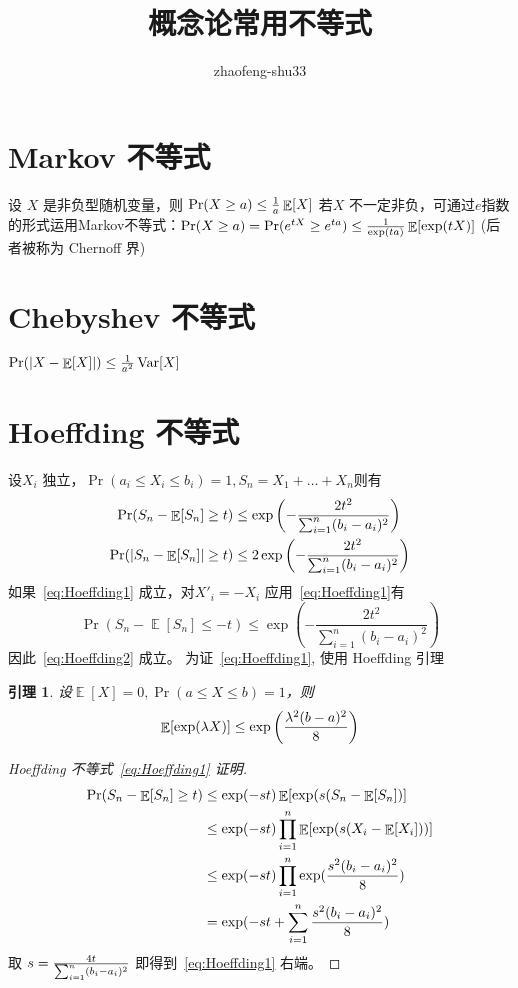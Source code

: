\documentclass{article}
\DeclareMathOperator\E{\mathbb{E}}
\DeclareMathOperator\Var{\mathrm{Var}}
\newtheorem{lemma}{引理}
\theoremstyle{definition}
\DeclarePairedDelimiter\abs{\lvert}{\rvert}
\begin{document}
\title{概念论常用不等式}
\author{zhaofeng-shu33}
\maketitle
\section{Markov 不等式}
设 $X$ 是非负型随机变量，则 $\Pr(X\geq a) \leq {1 \over a} \E[X]$
若$X$ 不一定非负，可通过$e$指数的形式运用Markov不等式：$\Pr(X\geq a) = \Pr(e^{tX} \geq e^{ta}) \leq { 1 \over \exp(ta)} \E[\exp(tX)]$
(后者被称为 Chernoff 界)

\section{Chebyshev 不等式}
$\Pr(\abs{X-\E[X]}) \leq {1 \over a^2} \Var[X]$
\section{Hoeffding 不等式}
设$X_i$ 独立，$\Pr(a_i \leq X_i \leq b_i) = 1, S_n = X_1 + \dots + X_n $则有
\begin{align}
\label{eq:Hoeffding1}\Pr( S_n - \E[S_n] \geq t) & \leq \exp \left( - \frac{2t^2}{\sum_{i=1}^n (b_i - a_i)^2} \right) \\
\label{eq:Hoeffding2}\Pr( \abs{S_n - \E[S_n] } \geq t) & \leq 2\exp \left( - \frac{2t^2}{\sum_{i=1}^n (b_i - a_i)^2} \right)
\end{align}
如果~\eqref{eq:Hoeffding1} 成立，对$X'_i= -X_i$ 应用~\eqref{eq:Hoeffding1}有
$$\Pr( S_n - \E[S_n]  \leq -t )  \leq \exp \left( - \frac{2t^2}{\sum_{i=1}^n (b_i - a_i)^2} \right)$$
因此~\eqref{eq:Hoeffding2} 成立。
为证~\eqref{eq:Hoeffding1}, 使用 Hoeffding 引理
\begin{lemma}
设$\E[X]=0, \Pr( a \leq X \leq b) = 1 $，则
\begin{equation}
\E[ \exp(\lambda X) ] \leq \exp\left({\lambda^2 (b-a)^2\over 8}\right)
\end{equation}
\end{lemma}
\begin{proof}[Hoeffding 不等式~\eqref{eq:Hoeffding1} 证明]
\begin{align*}
\Pr( S_n - \E[S_n] \geq t) & \leq \exp(-st) \E[\exp(s(S_n - \E[S_n]) ] \\
& \leq \exp(-st) \prod_{i=1}^n \E[\exp(s(X_i -\E[X_i]))] \\
& \leq \exp(-st) \prod_{i=1}^n \exp({s^2 (b_i - a_i)^2 \over 8 } ) \\
& = \exp(-st + \sum_{i=1}^n { s^2 (b_i - a_i)^2 \over 8} ) 
\end{align*}
取 $ s = {4t \over \sum_{i = 1}^n (b_i - a_i)^2}$ 即得到~\eqref{eq:Hoeffding1} 右端。
\end{proof}
\end{document}
